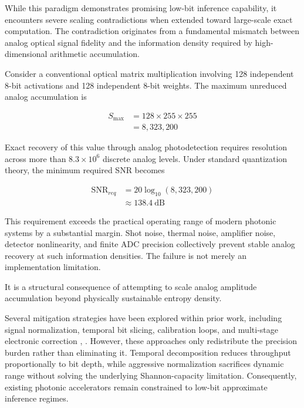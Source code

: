 \documentclass[journal]{IEEEtran}
\begin{document}
While this paradigm demonstrates promising low-bit inference capability, it encounters severe scaling contradictions when extended toward large-scale exact computation. The contradiction originates from a fundamental mismatch between analog optical signal fidelity and the information density required by high-dimensional arithmetic accumulation.

Consider a conventional optical matrix multiplication involving 128 independent 8-bit activations and 128 independent 8-bit weights. The maximum unreduced analog accumulation is

\begin{align}
S_{\max} &= 128 \times 255 \times 255 \\
&= 8{,}323{,}200 \label{eq:max_accumulation}
\end{align}

Exact recovery of this value through analog photodetection requires resolution across more than $8.3 \times 10^{6}$ discrete analog levels. Under standard quantization theory, the minimum required SNR becomes \cite{Winzer2006,Saleh2019}

\begin{align}
\mathrm{SNR}_{req} &= 20\log_{10}\left( 8{,}323{,}200 \right) \\
&\approx 138.4~\mathrm{dB} \label{eq:snr_requirement}
\end{align}

This requirement exceeds the practical operating range of modern photonic systems by a substantial margin. Shot noise, thermal noise, amplifier noise, detector nonlinearity, and finite ADC precision collectively prevent stable analog recovery at such information densities.
The failure is not merely an implementation limitation.

It is a structural consequence of attempting to scale analog amplitude accumulation beyond physically sustainable entropy density.

Several mitigation strategies have been explored within prior work, including signal normalization, temporal bit slicing, calibration loops, and multi-stage electronic correction \cite{Hamerly2022}, \cite{Cauwenberghs2013}. However, these approaches only redistribute the precision
burden rather than eliminating it. Temporal decomposition reduces throughput proportionally to bit depth, while aggressive normalization sacrifices dynamic range without solving the underlying Shannon-capacity limitation. Consequently, existing photonic accelerators remain constrained to low-bit approximate inference regimes.
\end{document}
